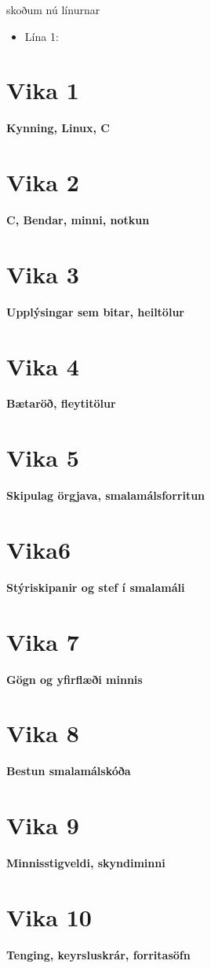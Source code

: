 \documentclass{article}
\begin{document}
skoðum nú línurnar
\begin{itemize}
    \item Lína 1:
\end{itemize}


\section{Vika 1}
\large{\textbf{Kynning, Linux, C}}


\section{Vika 2}
\large{\textbf{C, Bendar, minni, notkun}}


\section{Vika 3}
\large{\textbf{Upplýsingar sem bitar, heiltölur}}


\section{Vika 4}
\large{\textbf{Bætaröð, fleytitölur}}


\section{Vika 5}
\large{\textbf{Skipulag örgjava, smalamálsforritun}}


\section{Vika6}
\large{\textbf{Stýriskipanir og stef í smalamáli}}


\section{Vika 7}
\large{\textbf{Gögn og yfirflæði minnis}}


\section{Vika 8}
\large{\textbf{Bestun smalamálskóða}}


\section{Vika 9}
\large{\textbf{Minnisstigveldi, skyndiminni}}


\section{Vika 10}
\large{\textbf{Tenging, keyrsluskrár, forritasöfn}}
\end{document}
